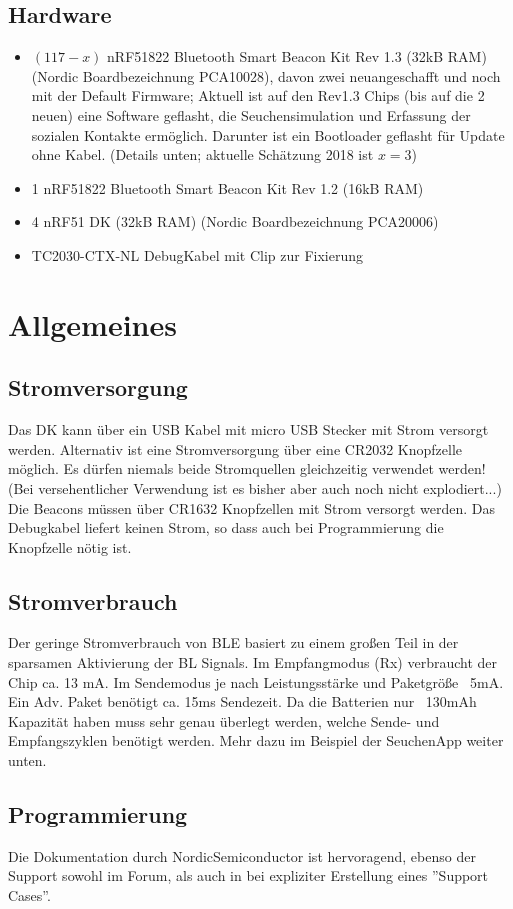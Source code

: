 \documentclass[11pt,ngerman]{scrartcl} %
\begin{document}
\subsection{Hardware}
\begin{itemize}
\item $(117-x)$ nRF51822 Bluetooth Smart Beacon Kit Rev 1.3 (32kB RAM) (Nordic Boardbezeichnung PCA10028), davon zwei neuangeschafft und noch mit der Default Firmware; Aktuell ist auf den Rev1.3 Chips (bis auf die 2 neuen) eine Software geflasht, die Seuchensimulation und Erfassung der sozialen Kontakte ermöglich. Darunter ist ein Bootloader geflasht für Update ohne Kabel. (Details unten; aktuelle Schätzung 2018 ist $x=3$)
\item 1 nRF51822 Bluetooth Smart Beacon Kit Rev 1.2 (16kB RAM)
\item 4 nRF51 DK (32kB RAM) (Nordic Boardbezeichnung PCA20006)
\item TC2030-CTX-NL  DebugKabel mit Clip zur Fixierung
\end{itemize}
\section{Allgemeines}
\subsection{Stromversorgung}
Das DK kann über ein USB Kabel mit micro USB Stecker mit Strom versorgt werden. Alternativ ist eine Stromversorgung über eine CR2032 Knopfzelle möglich. Es dürfen niemals beide Stromquellen gleichzeitig verwendet werden! (Bei versehentlicher Verwendung ist es bisher aber auch noch nicht explodiert...)
Die Beacons müssen über CR1632 Knopfzellen mit Strom versorgt werden. Das Debugkabel liefert keinen Strom, so dass auch bei Programmierung die Knopfzelle nötig ist.

\subsection{Stromverbrauch}
Der geringe Stromverbrauch von BLE basiert zu einem großen Teil in der sparsamen Aktivierung der BL Signals. Im Empfangmodus (Rx) verbraucht der Chip ca. 13 mA. Im Sendemodus je nach Leistungsstärke und Paketgröße ~5mA. Ein Adv. Paket benötigt ca. 15ms Sendezeit. Da die Batterien nur ~130mAh Kapazität haben muss sehr genau überlegt werden, welche Sende- und Empfangszyklen benötigt werden. Mehr dazu im Beispiel der SeuchenApp weiter unten.
\subsection{Programmierung}
Die Dokumentation durch NordicSemiconductor ist hervoragend, ebenso der Support sowohl im Forum, als auch in bei expliziter Erstellung eines ''Support Cases''. 
\end{document}
